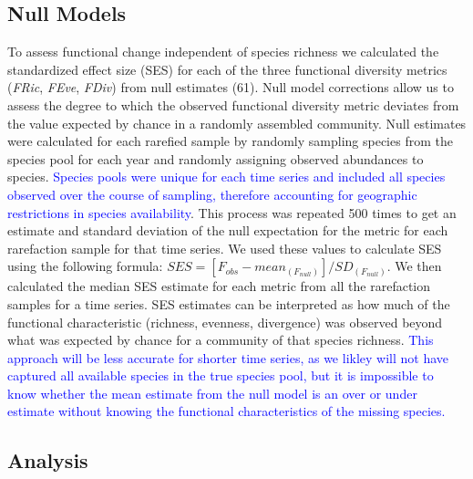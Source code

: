 \documentclass{article}
\begin{document}
\hypertarget{null-models}{%
\subsection{Null Models}\label{null-models}}

To assess functional change independent of species richness we
calculated the standardized effect size (SES) for each of the three
functional diversity metrics (\emph{FRic}, \emph{FEve}, \emph{FDiv})
from null estimates (61). Null model corrections allow us to assess the
degree to which the observed functional diversity metric deviates from
the value expected by chance in a randomly assembled community. Null
estimates were calculated for each rarefied sample by randomly sampling
species from the species pool for each year and randomly assigning
observed abundances to species.
\textcolor{blue}{Species pools were unique for each time series and included all species observed over the course of sampling, therefore accounting for geographic restrictions in species availability}.
This process was repeated 500 times to get an estimate and standard
deviation of the null expectation for the metric for each rarefaction
sample for that time series. We used these values to calculate SES using
the following formula:
\(SES = [F_{obs} - mean_{(F_{null})}]/SD_{(F_{null})}\). We then
calculated the median SES estimate for each metric from all the
rarefaction samples for a time series. SES estimates can be interpreted
as how much of the functional characteristic (richness, evenness,
divergence) was observed beyond what was expected by chance for a
community of that species richness.
\textcolor{blue}{This approach will be less accurate for shorter time series, as we likley will not have captured all available species in the true species pool, but it is impossible to know whether the mean estimate from the null model is an over or under estimate without knowing the functional characteristics of the missing species.}

\hypertarget{analysis}{%
\subsection{Analysis}\label{analysis}}
\end{document}
